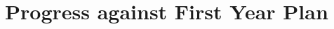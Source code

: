 \documentclass[12pt]{article}
\begin{document}
%
%




\clearpage

\section{Progress against First Year Plan}
\end{document}
